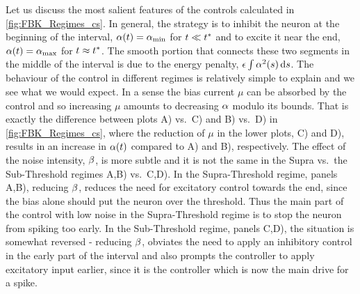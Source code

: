\documentclass{article}
\begin{document}
Let us discuss the most salient features of the controls calculated in
\cref{fig:FBK_Regimes_cs}. In general, the strategy is to inhibit the neuron at
the beginning of the interval, ${\alpha}(t) = { {\alpha}_{\textrm{min}} }$ for $t \ll { t^* }$ and to excite it
near the end, ${\alpha}(t) = { {\alpha}_{\textrm{max}} }$ for $t \approx { t^* }$. The smooth portion that connects these
two segments in the middle of the interval is due to the energy penalty, ${\epsilon} \int
{\alpha}^2(s) \, \mathrm{d} s$. The behaviour of the control in different regimes
is relatively simple to explain and we see what we would expect. In a
sense the bias current $\mu$ can be absorbed by the control and so increasing
$\mu$ amounts to decreasing ${\alpha}$ modulo its bounds. That is exactly the
difference between plots A) vs.\ C) and B) vs.\ D) in \cref{fig:FBK_Regimes_cs},
where the reduction of $\mu$ in the lower plots, C) and D), results in an
increase in ${\alpha}(t)$ compared to A) and B), respectively. The effect of the noise
intensity, ${\beta}$, is more subtle and it is not the same in the Supra vs.\ the
Sub-Threshold regimes A,B) vs.\ C,D). In the Supra-Threshold regime,  panels
A,B), reducing ${\beta}$, reduces the need for excitatory  control towards the end,
since the bias alone should put the neuron over the threshold. Thus the main
part of the control with low noise in the Supra-Threshold regime is to stop the
neuron from spiking too early. In the Sub-Threshold regime, panels C,D), the
situation is somewhat reversed - reducing ${\beta}$, obviates the need to apply an
inhibitory control in the early part of the interval and also prompts the
controller to apply excitatory input earlier, since it is the controller which
is now the main drive for a spike.
\end{document}
